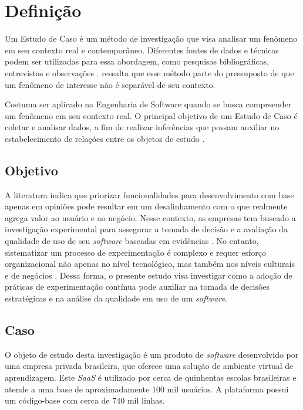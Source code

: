 \section{Definição}

Um Estudo de Caso é um método de investigação que visa analisar um fenômeno em seu contexto real e contemporâneo. Diferentes fontes de dados e técnicas podem ser utilizadas para essa abordagem, como pesquisas bibliográficas, entrevistas e observações \cite{wohlin_experimentation_2012}.  ressalta que esse método parte do pressuposto de que um fenômeno de interesse não é separável de seu contexto.

Costuma ser aplicado na Engenharia de Software quando se busca compreender um fenômeno em seu contexto real. O principal objetivo de um Estudo de Caso é coletar e analisar dados, a fim de realizar inferências que possam auxiliar no estabelecimento de relações entre os objetos de estudo \cite{wohlin_experimentation_2012}.


\subsection{Objetivo}

A literatura indica que priorizar funcionalidades para desenvolvimento com base apenas em opiniões pode resultar em um desalinhamento com o que realmente agrega valor ao usuário e ao negócio. Nesse contexto, as empresas tem buscado a investigação experimental para assegurar a tomada de decisão e a avaliação da qualidade de uso de seu \textit{software} baseadas em evidências \cite{olsson_opinions_2014}. No entanto, sistematizar um processo de experimentação é complexo e requer esforço organizacional não apenas no nível tecnológico, mas também nos níveis culturais e de negócios \cite{fabijan_evolution_2017}. Dessa forma, o presente estudo visa investigar como a adoção de práticas de experimentação contínua pode auxiliar na tomada de decisões estratégicas e na análise da qualidade em uso de um \textit{software}.


\subsection{Caso}

O objeto de estudo desta investigação é um produto de \textit{software} desenvolvido por uma empresa privada brasileira, que oferece uma solução de ambiente virtual de aprendizagem. Este \textit{SaaS} é utilizado por cerca de quinhentas escolas brasileiras e atende a uma base de aproximadamente 100 mil usuários. A plataforma possui um código-base com cerca de 740 mil linhas.


